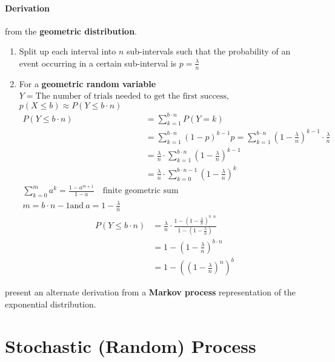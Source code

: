 \documentclass[12pt]{article}
\theoremstyle{plain}
\theoremstyle{definition}
\theoremstyle{remark}
\begin{document}
\paragraph{Derivation} from the \textbf{geometric distribution}.
\begin{enumerate}
\item Split up each interval into $n$ sub-intervals such that the probability
  of an event occurring in a certain sub-interval is $p = \frac{\lambda}{n}$
\item For a \textbf{geometric random variable}
  $Y = \text{The number of trials needed to get the first success}$,
  $p(X \leq b) \approx P(Y \leq b \cdot n)$
\begin{align*}
  P(Y \leq b \cdot n) & = \sum_{k=1}^{b \cdot n}P(Y=k) \\
                      & = \sum_{k=1}^{b \cdot n}(1-p)^{k-1}p =
                        \sum_{k=1}^{b \cdot n}\left(1-\frac{\lambda}{n}\right)^{k-1}
                        \cdot \frac{\lambda}{n} \\
                      & = \frac{\lambda}{n} \cdot \sum_{k=1}^{b \cdot n}
                        \left(1-\frac{\lambda}{n}\right)^{k-1} \\
                      & = \frac{\lambda}{n} \cdot \sum_{k=0}^{b \cdot n - 1}
                        \left(1-\frac{\lambda}{n}\right)^{k} \\
  \sum_{k=0}^{m}a^k = \frac{1-a^{m+1}}{1-a}\quad
  \text{finite geometric sum} \\
  m = b \cdot n - 1 \text{and}\ a = 1 - \frac{\lambda}{n}
\end{align*}
\begin{align*}
  P(Y \leq b \cdot n) & =
                        \frac{\lambda}{n} \cdot
                        \frac{1-\left(1-\frac{\lambda}{n}\right)^{b \cdot n}}{1-\left(1-\frac{\lambda}{n}\right)} \\
  & = 1 - \left(1-\frac{\lambda}{n}\right)^{b \cdot n} \\
  & = 1 - \left(\left(1-\frac{\lambda}{n}\right)^n\right)^b
\end{align*}

\end{enumerate}
\cite{yue18} present an alternate derivation from a \textbf{Markov process}
representation of the exponential distribution.

\section{Stochastic (Random) Process}
\end{document}
